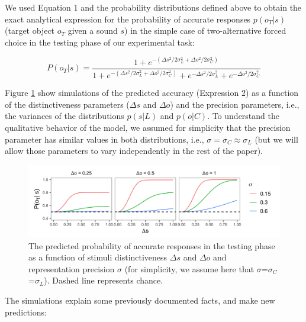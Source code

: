 \documentclass[10pt, letterpaper]{article}
\newenvironment{CodeChunk}{}{}
\begin{document}
We used Equation 1 and the probability distributions defined above to
obtain the exact analytical expression for the probability of accurate
responses \(p(o_T | s)\) (target object \(o_T\) given a sound \(s\)) in
the simple case of two-alternative forced choice in the testing phase of
our experimental task:

\begin{equation}
P(o_T|s)= \frac{1 + e^{-(\Delta s^2/2\sigma_L^2+ \Delta o^2/2\sigma_C^2)}}{1 + e^{-(\Delta s^2/2\sigma_L^2+ \Delta o^2/2\sigma_C^2)}+ e^{-\Delta s^2 /2\sigma_L^2} + e^{-\Delta o^2 /2\sigma_C^2 }}
\end{equation}

Figure \ref{fig:simulation} show simulations of the predicted accuracy
(Expression 2) as a function of the distinctiveness parameters
(\(\Delta s\) and \(\Delta o\)) and the precision parameters, i.e., the
variances of the distributions \(p(s| L)\) and \(p(o | C)\). To
understand the qualitative behavior of the model, we assumed for
simplicity that the precision parameter has similar values in both
distributions, i.e., \(\sigma =\sigma_C \approx \sigma_L\) (but we will
allow those parameters to vary independently in the rest of the paper).

\begin{CodeChunk}
\begin{figure}[h]

{\centering \includegraphics{figs/simulation-1} 

}

\caption{\label{fig:simulation}The predicted probability of accurate responses in the testing phase as a function of stimuli distinctiveness $\Delta s$ and $\Delta o$ and representation precision $\sigma$ (for simplicity, we assume here that $\sigma$=$\sigma_C$=$\sigma_L$). Dashed line represents chance.}\label{fig:simulation}
\end{figure}
\end{CodeChunk}

The simulations explain some previously documented facts, and make new
predictions:
\end{document}
